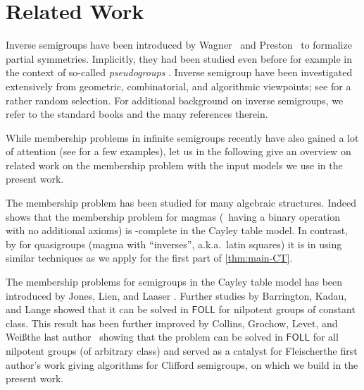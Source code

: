 \section{Related Work}
\label{sec:related-work}

Inverse semigroups have been introduced by Wagner~\cite{Wagner52} and Preston~\cite{Preston54} to formalize partial symmetries. 
Implicitly, they had been studied even before for example in the context of so-called \emph{pseudogroups} \cite{Golab39}.
Inverse semigroup have been investigated extensively from geometric, combinatorial, and algorithmic viewpoints; see \eg \cite{ElliottLM24,Gray2020,Margolis-Meakin:1989,ms96,mun74,OlijnykSS10,Djadchenko77,Kleiman76,Kleiman79} for a rather random selection.
For additional background on inverse semigroups, we refer to the standard books \cite{Law99,Petrich84} and the many references therein.


While membership problems in infinite semigroups recently have also gained a lot of attention (see \cite{ChoffrutK05,BellHP17,DiekertPS2024,Dong24} for a few examples), let us in the following give an overview on related work on the membership problem with the input models we use in the present work.




The membership problem has been studied for many algebraic structures.
Indeed \cite{JonesL76} shows that the membership problem for magmas (\ie\ having a binary operation with no additional axioms) is \Ptime-complete in the Cayley table model.
In contrast, by \cite{CollinsGLW24} for quasigroups (magma with ``inverses'', a.k.a.\ latin squares) it is in \NPOLYLOGTIME using similar techniques as  we apply for the first part of \cref{thm:main-CT}. 

The membership problems for semigroups in the Cayley table model has been introduced by Jones, Lien, and Laaser \cite{JonesLL76}.
Further studies by Barrington, Kadau, and Lange \cite{BarringtonKLM01} showed that it can be solved in $\mathsf{FOLL}$ for nilpotent groups of constant class.
This result has been further improved by Collins, Grochow, Levet, and \ifAnonimous Weiß\else the last author\fi~\cite{CollinsGLW24} showing that the problem can be solved in $\mathsf{FOLL}$ for all nilpotent groups (\ie of arbitrary class) and served as a catalyst for \ifAnonimous Fleischer\else the first author\fi's work \cite{Fleischer19diss,Fleischer22} giving \NPOLYLOGTIME algorithms for Clifford semigroups, on which we build in the present work.

